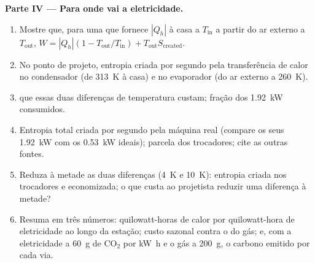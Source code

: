\begin{problem}
\medskip
\noindent\textbf{Parte IV --- Para onde vai a eletricidade.}
\begin{enumerate}[resume]
  \item Mostre que, para uma  que fornece $|Q_h|$ à casa a
        $T_{\mathrm{in}}$ a partir do ar externo a $T_{\mathrm{out}}$,
        $W = |Q_h|(1 - T_{\mathrm{out}}/T_{\mathrm{in}}) + T_{\mathrm{out}}S_{\mathrm{created}}$.
  \item No ponto de projeto, entropia criada por segundo pela
        transferência de calor no condensador (de \qty{313}{K} à casa) e
        no evaporador (do ar externo a \qty{260}{K}).
  \item {} que essas duas diferenças de temperatura custam;
        fração dos \qty{1.92}{kW} consumidos.
  \item Entropia total criada por segundo pela máquina real (compare
        os seus \qty{1.92}{kW} com os \qty{0.53}{kW} ideais); parcela dos
        trocadores; cite as outras fontes.
  \item Reduza à metade as duas diferenças (\qty{4}{K} e \qty{10}{K}): entropia criada
        nos trocadores e  economizada; o que custa ao
        projetista reduzir uma diferença à metade?
  \item Resuma em três números: quilowatt-horas de calor por
        quilowatt-hora de eletricidade ao longo da estação; custo sazonal
        contra o do gás; e, com a eletricidade a \qty{60}{g} de CO$_2$ por
        \unit{kW h} e o gás a \qty{200}{g}, o carbono emitido por cada
        via.
\end{enumerate}
\end{problem}
